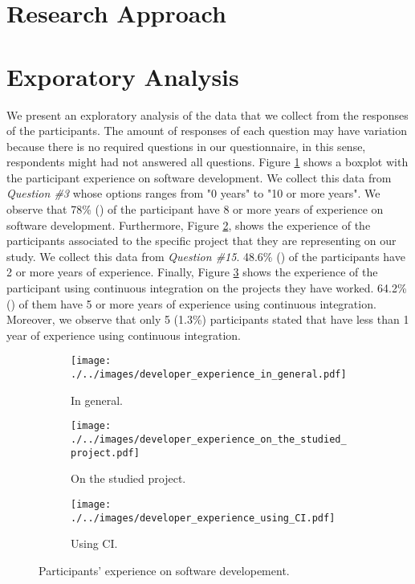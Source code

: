 	\section{Research Approach}
	\label{sec:research_approach}
	
	\lipsum*[1]
	
	\section{Exporatory Analysis}
	\label{sec:exploratory_analysis}
	
	We present an exploratory analysis of the data that we collect from the responses of the participants. The amount of responses of each question may have variation because there is no required questions in our questionnaire, in this sense, respondents might had not answered all questions. 
	Figure \ref{fig:developers_experience_in_general} shows a boxplot with the participant experience on software development. We collect this data from \textit{Question \#3} whose options ranges from "0 years" to "10 or more years". We observe that 78\% () of the participant have 8 or more years of experience on software development. Furthermore, Figure \ref{fig:developers_experience_on_the_studied_project}, shows the experience of the participants associated to the specific project that they are representing on our study. We collect this data from \textit{Question \#15}. 48.6\% () of the participants have 2 or more years of experience. Finally, Figure \ref{fig:developers_experience_using_ci} shows the experience of the participant using continuous integration on the projects they have worked. 64.2\%  () of them have 5 or more years of experience using continuous integration. Moreover, we observe that only 5 (1.3\%) participants stated that have less than 1 year of experience using continuous integration. 
	
	\begin{figure}[H]
	\begin{subfigure}[b]{0.3\textwidth}
		\centering
		\texttt{[image: ./../images/developer\_experience\_in\_general.pdf]}
		\caption{In general.}
		\label{fig:developers_experience_in_general}
	\end{subfigure} %
	\begin{subfigure}[b]{0.3\textwidth}
		\centering
		\texttt{[image: ./../images/developer\_experience\_on\_the\_studied\_project.pdf]}
		\caption{On the studied project.}
		\label{fig:developers_experience_on_the_studied_project}
	\end{subfigure}
		\begin{subfigure}[b]{0.3\textwidth}
		\centering
		\texttt{[image: ./../images/developer\_experience\_using\_CI.pdf]}  
		\caption{Using CI.}
		\label{fig:developers_experience_using_ci}
	\end{subfigure}
		\caption{Participants' experience on software developement.}
		\label{fig:developers_experience}
	\end{figure}

